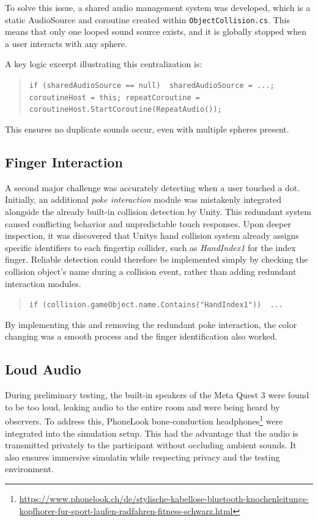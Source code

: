 To solve this issue, a shared audio management system was developed, which is a static AudioSource and coroutine created within \texttt{ObjectCollision.cs}. This means that only one looped sound source exists, and it is globally stopped when a user interacts with any sphere.

A key logic excerpt illustrating this centralization is:

\begin{quote} \small \texttt{if (sharedAudioSource == null) { sharedAudioSource = ...; coroutineHost = this; repeatCoroutine = coroutineHost.StartCoroutine(RepeatAudio());}} \end{quote}

This ensures no duplicate sounds occur, even with multiple spheres present.

\subsection{Finger Interaction} 
A second major challenge was accurately detecting when a user touched a dot. Initially, an additional \textit{poke interaction} module was mistakenly integrated alongside the already built-in collision detection by Unity. This redundant system caused conflicting behavior and unpredictable touch responses. Upon deeper inspection, it was discovered that Unitys hand collision system already assigns specific identifiers to each fingertip collider, such as \textit{HandIndex1} for the index finger. Reliable detection could therefore be implemented simply by checking the collision object's name during a collision event, rather than adding redundant interaction modules.

\begin{quote} \small \texttt{if (collision.gameObject.name.Contains("HandIndex1")) { ... }} \end{quote}

By implementing this and removing the redundant poke interaction, the color changing was a smooth process and the finger identification also worked.

\subsection{Loud Audio} 
During preliminary testing, the built-in speakers of the Meta Quest 3 were found to be too loud, leaking audio to the entire room and were being heard by observers. To address this, PhoneLook bone-conduction headphones\footnote{\url{https://www.phonelook.ch/de/stylische-kabellose-bluetooth-knochenleitungs-kopfhorer-fur-sport-laufen-radfahren-fitness-schwarz.html}} were integrated into the simulation setup. This had the advantage that the audio is transmitted privately to the participant without occluding ambient sounds.
It also ensures immersive simulatin while respecting privacy and the testing environment.

